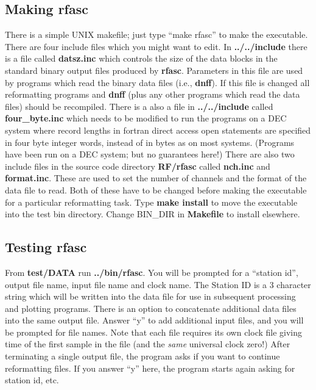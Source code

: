 \subsection{Making rfasc}

There is a simple UNIX makefile; just type ``make rfasc''
to make the executable.  There are four include files
which you might want to edit.  In {\bf ../../include}
there is a file called {\bf datsz.inc} which controls the size of
the data blocks in the standard binary output files produced by 
{\bf rfasc}.  Parameters in this file are used by programs which
read the binary data files (i.e., {\bf dnff}).
If this file is changed all reformatting programs and 
{\bf dnff} (plus any other programs which read the data files)
should be recompiled.  There is a also a file in {\bf ../../include}
called {\bf four\_byte.inc} which needs to be modified to run the programs
on a DEC system where record lengths in fortran direct access open
statements are specified in four byte integer words, instead of in
bytes as on most systems.  
(Programs have been run on a DEC system; but no guarantees here!)
There are also two include files in 
the source code directory {\bf RF/rfasc} called {\bf nch.inc}
and {\bf format.inc}.  These are used to set the number of channels
and the format of the data file to read.  Both of these have to be
changed before making the executable for a particular reformatting task.
Type {\bf make install} to move the executable into the test bin 
directory.  Change BIN\_DIR in {\bf Makefile} to install elsewhere.

\subsection{Testing rfasc}

From {\bf test/DATA} run {\bf ../bin/rfasc}.
You will be prompted for a ``station id'',
output file name, input file name and clock name.
The Station ID is a 3 character string which will be
written into the data file for use in subsequent
processing and plotting programs.
There is an option to concatenate additional data
files into the same output file.  Answer 
``y'' to add additional input files, and you 
will be prompted for file names.
Note that each file requires its own clock file
giving time of the first sample in the file (and the {\it same} universal clock
zero!)  After terminating a single output file, the program asks
if you want to continue reformatting files.  If you
answer ``y'' here, the program starts again asking for station id, etc.

